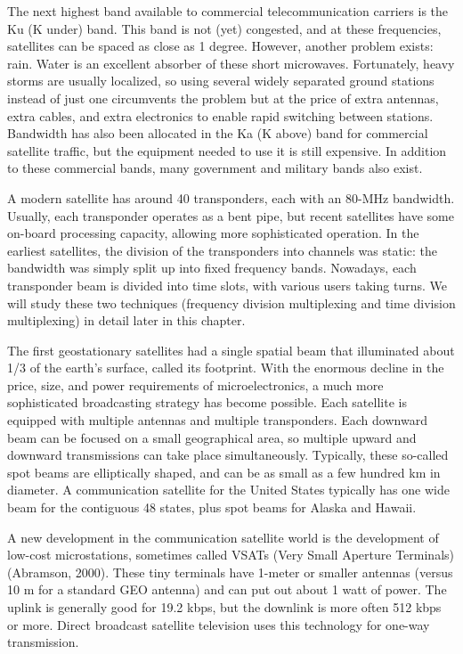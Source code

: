 \documentclass[b5paper,11pt]{memoir}
\begin{document}
The next highest band available to commercial telecommunication carriers
is the Ku (K under) band. This band is not (yet) congested, and at these
frequencies, satellites can be spaced as close as 1 degree. However,
another problem exists: rain. Water is an excellent absorber of these
short microwaves. Fortunately, heavy storms are usually localized, so
using several widely separated ground stations instead of just one
circumvents the problem but at the price of extra antennas, extra
cables, and extra electronics to enable rapid switching between
stations. Bandwidth has also been allocated in the Ka (K above) band for
commercial satellite traffic, but the equipment needed to use it is
still expensive. In addition to these commercial bands, many government
and military bands also exist.

A modern satellite has around 40 transponders, each with an 80-MHz
bandwidth. Usually, each transponder operates as a bent pipe, but recent
satellites have some on-board processing capacity, allowing more
sophisticated operation. In the earliest satellites, the division of the
transponders into channels was static: the bandwidth was simply split up
into fixed frequency bands. Nowadays, each transponder beam is divided
into time slots, with various users taking turns. We will study these
two techniques (frequency division multiplexing and time division
multiplexing) in detail later in this chapter.

The first geostationary satellites had a single spatial beam that
illuminated about 1/3 of the earth's surface, called its {footprint}.
With the enormous decline in the price, size, and power requirements of
microelectronics, a much more sophisticated broadcasting strategy has
become possible. Each satellite is equipped with multiple antennas and
multiple transponders. Each downward beam can be focused on a small
geographical area, so multiple upward and downward transmissions can
take place simultaneously. Typically, these so-called {spot beams} are
elliptically shaped, and can be as small as a few hundred km in
diameter. A communication satellite for the United States typically has
one wide beam for the contiguous 48 states, plus spot beams for Alaska
and Hawaii.

A new development in the communication satellite world is the
development of low-cost microstations, sometimes called {VSATs} ({Very
Small Aperture Terminals}) (Abramson, 2000). These tiny terminals have
1-meter or smaller antennas (versus 10 m for a standard GEO antenna) and
can put out about 1 watt of power. The uplink is generally good for 19.2
kbps, but the downlink is more often 512 kbps or more. Direct broadcast
satellite television uses this technology for one-way transmission.
\end{document}
